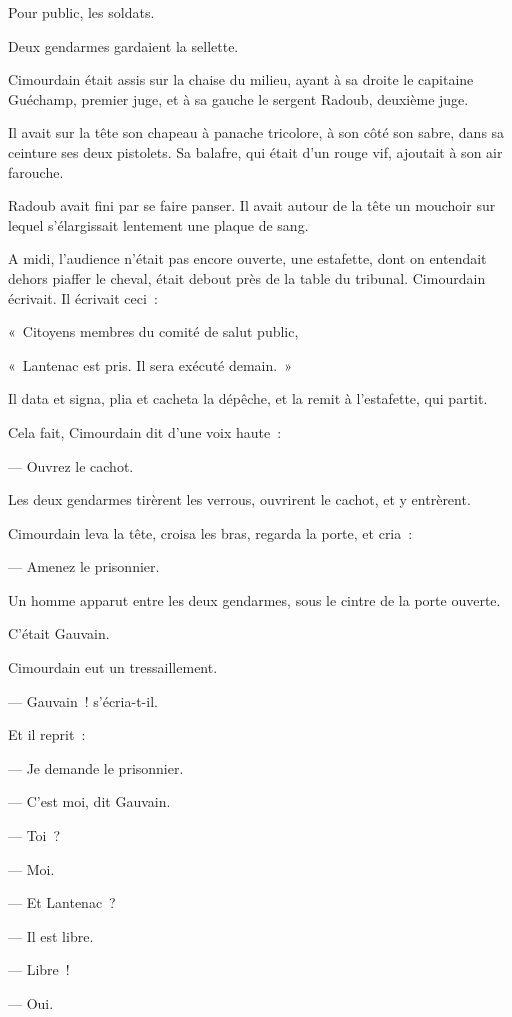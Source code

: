 \documentclass[french,twoside]{book} %
\begin{document}
Pour public, les soldats.\par
Deux gendarmes gardaient la sellette.\par
Cimourdain était assis sur la chaise du milieu, ayant à sa droite le capitaine Guéchamp, premier juge, et à sa gauche le sergent Radoub, deuxième juge.\par
Il avait sur la tête son chapeau à panache tricolore, à son côté son sabre, dans sa ceinture ses deux pistolets. Sa balafre, qui était d’un rouge vif, ajoutait à son air farouche.\par
Radoub avait fini par se faire panser. Il avait autour de la tête un mouchoir sur lequel s’élargissait lentement une plaque de sang.\par
 A midi, l’audience n’était pas encore ouverte, une estafette, dont on entendait dehors piaffer le cheval, était debout près de la table du tribunal. Cimourdain écrivait. Il écrivait ceci :\par
« Citoyens membres du comité de salut public,\par
« Lantenac est pris. Il sera exécuté demain. »\par
Il data et signa, plia et cacheta la dépêche, et la remit à l’estafette, qui partit.\par
Cela fait, Cimourdain dit d’une voix haute :\par
— Ouvrez le cachot.\par
Les deux gendarmes tirèrent les verrous, ouvrirent le cachot, et y entrèrent.\par
Cimourdain leva la tête, croisa les bras, regarda la porte, et cria :\par
— Amenez le prisonnier.\par
Un homme apparut entre les deux gendarmes, sous le cintre de la porte ouverte.\par
C’était Gauvain.\par
Cimourdain eut un tressaillement.\par
— Gauvain ! s’écria-t-il.\par
Et il reprit :\par
— Je demande le prisonnier.\par
— C’est moi, dit Gauvain.\par
— Toi ?\par
— Moi.\par
— Et Lantenac ?\par
— Il est libre.\par
— Libre !\par
— Oui.\par
\end{document}
